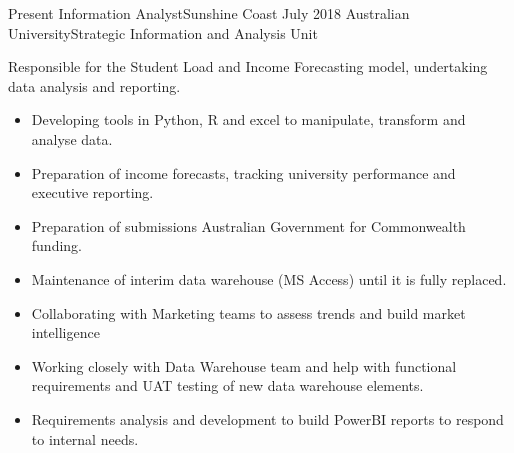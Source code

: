 %
%
%

\begin{experiences}
  \consultantexperience
    {Present}   {Information Analyst}{}{Sunshine Coast}
    {July 2018}  {Australian University}{Strategic Information and Analysis Unit}
    {Responsible for the Student Load and Income Forecasting model, undertaking data analysis and reporting.
                  \begin{itemize}
		\item Developing tools in Python, R and excel to manipulate, transform and analyse data.
		\item Preparation of income forecasts, tracking university performance and executive reporting.
		\item Preparation of submissions Australian Government for Commonwealth funding.
		\item Maintenance of interim data warehouse (MS Access) until it is fully replaced.
		\item Collaborating with Marketing teams to assess trends and build market intelligence 
		\item Working closely with Data Warehouse team and help with functional requirements and UAT testing of new data warehouse elements.
		\item Requirements analysis and development to build PowerBI reports to respond to internal needs.
                                                              

\end{itemize}}
\end{experiences}
